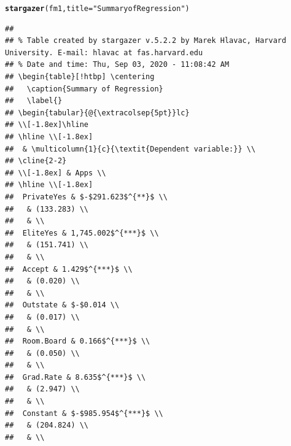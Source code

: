 \documentclass{article}\usepackage[]{graphicx}\usepackage[]{color}
\makeatletter
\newcommand{\hlstr}[1]{\textcolor[rgb]{0.192,0.494,0.8}{#1}}%
\newcommand{\hlstd}[1]{\textcolor[rgb]{0.345,0.345,0.345}{#1}}%
\newcommand{\hlkwc}[1]{\textcolor[rgb]{0.333,0.667,0.333}{#1}}%
\newcommand{\hlkwd}[1]{\textcolor[rgb]{0.737,0.353,0.396}{\textbf{#1}}}%
\newenvironment{kframe}{%
 \def\at@end@of@kframe{}%
 \ifinner\ifhmode%
  \def\at@end@of@kframe{\end{minipage}}%
  \begin{minipage}{\columnwidth}%
 \fi\fi%
 \def\FrameCommand##1{\hskip\@totalleftmargin \hskip-\fboxsep
 \colorbox{shadecolor}{##1}\hskip-\fboxsep
     \hskip-\linewidth \hskip-\@totalleftmargin \hskip\columnwidth}%
 \MakeFramed {\advance\hsize-\width
   \@totalleftmargin\z@ \linewidth\hsize
   \@setminipage}}%
 {\par\unskip\endMakeFramed%
 \at@end@of@kframe}
\newenvironment{knitrout}{}{} %
\makeatother
\begin{document}
\begin{knitrout}
\color{fgcolor}\begin{kframe}
\begin{alltt}
\hlkwd{stargazer}\hlstd{(fm1,} \hlkwc{title} \hlstd{=} \hlstr{"Summary of Regression"}\hlstd{)}
\end{alltt}
\begin{verbatim}
## 
## % Table created by stargazer v.5.2.2 by Marek Hlavac, Harvard University. E-mail: hlavac at fas.harvard.edu
## % Date and time: Thu, Sep 03, 2020 - 11:08:42 AM
## \begin{table}[!htbp] \centering 
##   \caption{Summary of Regression} 
##   \label{} 
## \begin{tabular}{@{\extracolsep{5pt}}lc} 
## \\[-1.8ex]\hline 
## \hline \\[-1.8ex] 
##  & \multicolumn{1}{c}{\textit{Dependent variable:}} \\ 
## \cline{2-2} 
## \\[-1.8ex] & Apps \\ 
## \hline \\[-1.8ex] 
##  PrivateYes & $-$291.623$^{**}$ \\ 
##   & (133.283) \\ 
##   & \\ 
##  EliteYes & 1,745.002$^{***}$ \\ 
##   & (151.741) \\ 
##   & \\ 
##  Accept & 1.429$^{***}$ \\ 
##   & (0.020) \\ 
##   & \\ 
##  Outstate & $-$0.014 \\ 
##   & (0.017) \\ 
##   & \\ 
##  Room.Board & 0.166$^{***}$ \\ 
##   & (0.050) \\ 
##   & \\ 
##  Grad.Rate & 8.635$^{***}$ \\ 
##   & (2.947) \\ 
##   & \\ 
##  Constant & $-$985.954$^{***}$ \\ 
##   & (204.824) \\ 
##   & \\ 

\end{verbatim}
\end{kframe}
\end{knitrout}
\end{document}
